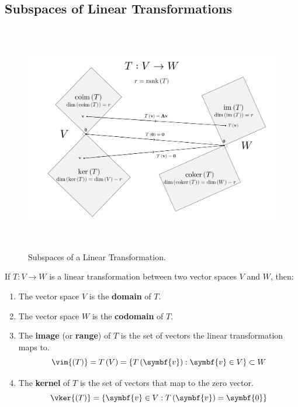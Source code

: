 \documentclass{article}
\begin{document}
\subsection{Subspaces of Linear Transformations}
\begin{figure}[H]
    \centering
    \includegraphics[height=10cm, keepaspectratio]{figures/matrix_transformation.pdf}
    \caption{Subspaces of a Linear Transformation.}
\end{figure}
\begin{definition}
    If \(T:V \rightarrow W\) is a linear transformation between two
    vector spaces \(V\) and \(W\), then:
    \begin{enumerate}
        \item The vector space \(V\) is the \textbf{domain} of \(T\).
        \item The vector space \(W\) is the \textbf{codomain} of \(T\).
        \item The \textbf{image} (or \textbf{range}) of \(T\) is the
              set of vectors the linear transformation maps to.
              \begin{equation*}
                  \vim{\left( T \right)} = T\left(V\right) = \left\{ T\left(\symbf{v}\right) : \symbf{v}\in V \right\} \subset W
              \end{equation*}
        \item The \textbf{kernel} of \(T\) is the set of vectors that
              map to the zero vector.
              \begin{equation*}
                  \vker{\left( T \right)} = \left\{ \symbf{v}\in V : T\left(\symbf{v}\right)=\symbf{0} \right\}
              \end{equation*}
    \end{enumerate}
\end{definition}
\end{document}
